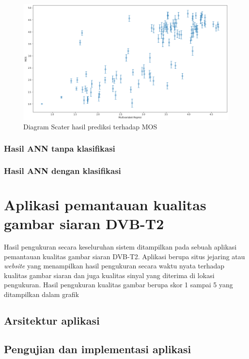 \begin{figure}[H]
	\vspace{-0.1cm}
	\begin{center}
		\includegraphics[width=1\columnwidth]{bab4/Gambar/scater-regresi.png}
	\end{center}
	\vspace{-0.2cm}
	\caption{Diagram Scater hasil prediksi terhadap MOS}
	\label{scater_regresi}
\end{figure}

\subsubsection{Hasil ANN tanpa klasifikasi}
\subsubsection{Hasil ANN dengan klasifikasi}


\section{Aplikasi  pemantauan kualitas gambar siaran DVB-T2}
\hspace{1,2cm}
Hasil pengukuran secara keseluruhan sistem ditampilkan pada sebuah aplikasi pemantauan kualitas gambar siaran DVB-T2. Aplikasi berupa situs jejaring atau \textit{website} yang menampilkan hasil pengukuran secara waktu nyata terhadap kualitas gambar siaran dan juga kualitas sinyal yang diterima di lokasi pengukuran. Hasil pengukuran kualitas gambar berupa skor 1 sampai 5 yang ditampilkan dalam grafik 

\subsection{Arsitektur aplikasi}
\hspace{1,2cm}

\subsection{Pengujian dan implementasi  aplikasi}
\hspace{1,2cm}


